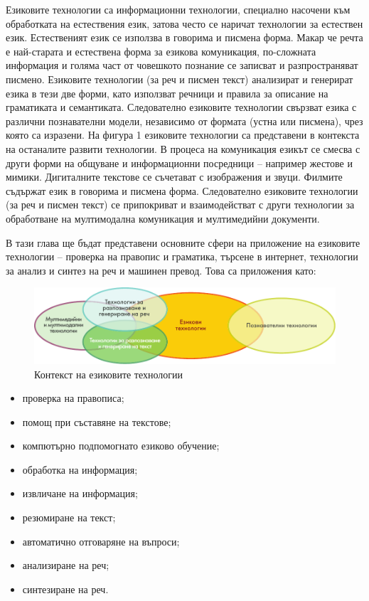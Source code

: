   \begin{multicols}{2}

  Езиковите технологии са информационни технологии, специално насочени към обработката на естествения език, затова често се наричат технологии за естествен език. Естественият език се използва в говорима и писмена форма. Макар че речта е най-старата и естествена форма за езикова комуникация, по-сложната информация и голяма част от човешкото познание се записват и разпространяват писмено. Езиковите технологии (за реч и писмен текст) анализират и генерират езика в тези две форми, като използват речници и правила за описание на граматиката и семантиката. Следователно езиковите технологии свързват езика с различни познавателни модели, независимо от формата (устна или писмена), чрез която са изразени.
  На фигура 1 езиковите технологии са представени в контекста на останалите развити технологии. В процеса на комуникация езикът се смесва с други форми на общуване и информационни посредници -- например жестове и мимики. Дигиталните текстове се съчетават с изображения и звуци. Филмите съдържат език в говорима и писмена форма. Следователно езиковите технологии (за реч и писмен текст) се припокриват и взаимодействат с други технологии за  обработване на мултимодална комуникация и мултимедийни документи. 

  В тази глава  ще бъдат представени основните сфери на приложение на
  езиковите технологии -- проверка на правопис и граматика, търсене в
  интернет, технологии за анализ и синтез на реч и машинен превод. Това
  са приложения като: 

  \begin{figure}[htb]
    \center
    \includegraphics[width=\textwidth]{../_media/bulgarian/language_technologies}
    \caption{Контекст на езиковите технологии}
    \label{fig:ltincontext_de}
  \end{figure}

  \begin{itemize}
  \item проверка на правописа;
  \item помощ при съставяне на текстове;
  \item компютърно подпомогнато езиково обучение;
  \item обработка на информация;
  \item извличане на информация;
  \item резюмиране на текст;
  \item автоматично отговаряне на въпроси;
  \item анализиране на реч;
  \item синтезиране на реч.
  \end{itemize}


\end{multicols}
